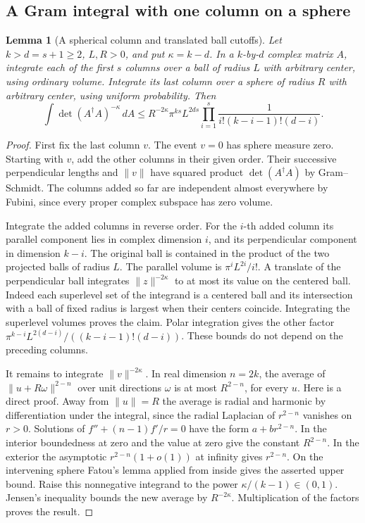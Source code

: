\documentclass[a4paper,11pt]{article}
\newtheorem{lemma}[proposition]{Lemma}
\theoremstyle{definition}
\theoremstyle{remark}
\numberwithin{equation}{section}
\begin{document}
\subsection{A Gram integral with one column on a sphere}\label{nav:III-64}
\begin{lemma}[A spherical column and translated ball cutoffs]\leavevmode
\label{lem:spheregram300}
Let \(k>d=s+1\ge2\), \(L,R>0\), and put \(\kappa=k-d\).
In a \(k\)-by-\(d\) complex matrix \(A\), integrate each of the
first \(s\) columns over a ball of radius \(L\) with arbitrary
center, using ordinary volume. Integrate its last column over
a sphere of radius \(R\) with arbitrary center, using uniform
probability. Then
\[
 \int \det(A^\dagger A)^{-\kappa}\,dA
 \le R^{-2\kappa}\pi^{ks}L^{2ds}
       \prod_{i=1}^s\frac{1}{i!(k-i-1)!(d-i)} .
\]
\end{lemma}
\begin{proof}
First fix the last column \(v\). The event \(v=0\) has sphere
measure zero. Starting with \(v\), add the other columns in their
given order. Their successive perpendicular lengths and \(\|v\|\)
have squared product \(\det(A^\dagger A)\) by Gram--Schmidt.
The columns added so far are independent almost everywhere by
Fubini, since every proper complex subspace has zero volume.

Integrate the added columns in reverse order. For the \(i\)-th
added column its parallel component lies in complex dimension
\(i\), and its perpendicular component in dimension \(k-i\).
The original ball is contained in the product of the two
projected balls of radius \(L\). The parallel volume is
\(\pi^iL^{2i}/i!\). A translate of the perpendicular ball
integrates \(\|z\|^{-2\kappa}\) to at most its value on the
centered ball. Indeed each superlevel set of the integrand
is a centered ball and its intersection with a ball of fixed
radius is largest when their centers coincide. Integrating the
superlevel volumes proves the claim. Polar integration gives
the other factor
\(\pi^{k-i}L^{2(d-i)}/((k-i-1)!(d-i))\).
These bounds do not depend on the preceding columns.

It remains to integrate \(\|v\|^{-2\kappa}\). In real dimension
\(n=2k\), the average of \(\|u+R\omega\|^{2-n}\) over unit
directions \(\omega\) is at most \(R^{2-n}\), for every \(u\).
Here is a direct proof. Away from \(\|u\|=R\) the average is
radial and harmonic by differentiation under the integral,
since the radial Laplacian of \(r^{2-n}\) vanishes on \(r>0\).
Solutions of \(f''+(n-1)f'/r=0\) have the form
\(a+b r^{2-n}\). In the interior boundedness at zero and the
value at zero give the constant \(R^{2-n}\).
In the exterior the asymptotic \(r^{2-n}(1+o(1))\) at
infinity gives \(r^{2-n}\). On the intervening sphere Fatou's
lemma applied from inside gives the asserted upper bound.
Raise this nonnegative integrand to the power
\(\kappa/(k-1)\in(0,1)\). Jensen's inequality bounds the new
average by \(R^{-2\kappa}\). Multiplication of the factors
proves the result.
\end{proof}
\end{document}
